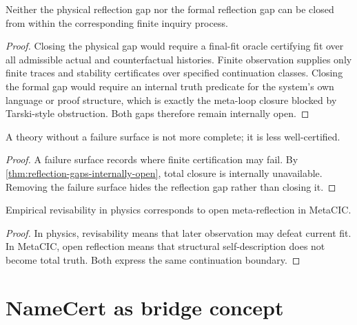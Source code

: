 \begin{theorem}
\label{thm:reflection-gaps-internally-open}
Neither the physical reflection gap nor the formal reflection gap can be closed from within the corresponding finite inquiry process.
\end{theorem}

\begin{proof}
Closing the physical gap would require a final-fit oracle certifying fit over all admissible actual and counterfactual histories. Finite observation supplies only finite traces and stability certificates over specified continuation classes. Closing the formal gap would require an internal truth predicate for the system's own language or proof structure, which is exactly the meta-loop closure blocked by Tarski-style obstruction. Both gaps therefore remain internally open.
\end{proof}

\begin{corollary}
\label{cor:failure-surfaces-necessary}
A theory without a failure surface is not more complete; it is less well-certified.
\end{corollary}

\begin{proof}
A failure surface records where finite certification may fail. By \autoref{thm:reflection-gaps-internally-open}, total closure is internally unavailable. Removing the failure surface hides the reflection gap rather than closing it.
\end{proof}

\begin{corollary}
\label{cor:empirical-revisability-open-reflection}
Empirical revisability in physics corresponds to open meta-reflection in MetaCIC.
\end{corollary}

\begin{proof}
In physics, revisability means that later observation may defeat current fit. In MetaCIC, open reflection means that structural self-description does not become total truth. Both express the same continuation boundary.
\end{proof}

\section{NameCert as bridge concept}
\label{sec:namecert-bridge-concept}

